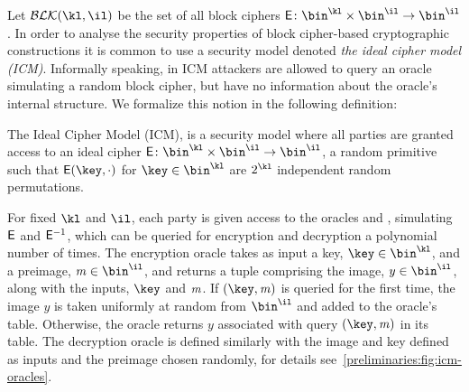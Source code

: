 Let $\blockSet(\kl, \il)$ be the set of all block ciphers $\Enc \colon \bin^{\kl} \times \bin^{\il} \to \bin^{\il}$. In order to analyse the security properties of block cipher-based cryptographic constructions it is common to use a security model denoted \emph{the ideal cipher model (ICM)}. Informally speaking, in ICM attackers are allowed to query an oracle simulating a random block cipher, but have no information about the oracle's internal structure. We formalize this notion in the following definition:

\begin{definition}\label{preliminaries:def:ICM}
    The Ideal Cipher Model (ICM), is a security model where all parties are granted access to an ideal cipher $\Enc \colon \bin^{\kl} \times \bin^\il \to \bin^\il$, a random primitive such that $\Enc (\key, \cdot )$ for $\key \in \bin^{\kl}$ are $2^{\kl}$ independent random permutations.
\end{definition}

For fixed $\kl$ and $\il$, each party is given access to the oracles \oracleEnc{} and \oracleDec{}, simulating $\mathsf{E}$ and $\mathsf{E}^{-1}$, which can be queried for encryption and decryption a polynomial number of times. The encryption oracle takes as input a key, $\key\in \bin^{\kl}$, and a preimage, $\msg \in \bin^{\il}$, and returns a tuple comprising the image, $y \in \bin^{\il}$, along with the inputs, $\key$ and $\mathit{m}$. If $(\key, \msg)$ is queried for the first time, the image $y$ is taken uniformly at random from $\bin^{\il}$ and added to the oracle's table. Otherwise, the oracle returns  $y$ associated with query $(\key, \msg)$ in its table. The decryption oracle is defined similarly with the image and key defined as inputs and the preimage chosen randomly, for details see~\cref{preliminaries:fig:icm-oracles}.

